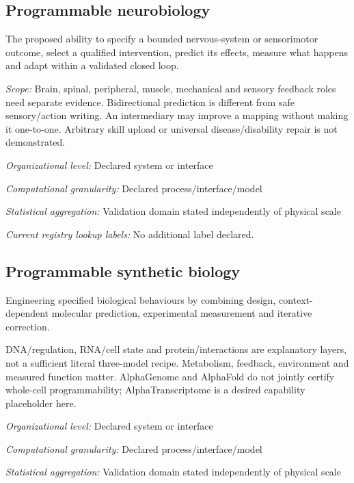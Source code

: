 \begin{samepage}
\subsection*{Programmable neurobiology}
\noindent The proposed ability to specify a bounded nervous-system or sensorimotor outcome, select a qualified intervention, predict its effects, measure what happens and adapt within a validated closed loop.\par
\end{samepage}
\noindent\textit{Scope:} Brain, spinal, peripheral, muscle, mechanical and sensory feedback roles need separate evidence. Bidirectional prediction is different from safe sensory/action writing. An intermediary may improve a mapping without making it one-to-one. Arbitrary skill upload or universal disease/disability repair is not demonstrated.\par
\noindent\textit{Organizational level:} Declared system or interface\par
\noindent\textit{Computational granularity:} Declared process/interface/model\par
\noindent\textit{Statistical aggregation:} Validation domain stated independently of physical scale\par


\noindent\textit{Current registry lookup labels:} No additional label declared.\par

\begin{samepage}
\subsection*{Programmable synthetic biology}
\noindent Engineering specified biological behaviours by combining design, context-dependent molecular prediction, experimental measurement and iterative correction.\par
\end{samepage}
\noindent DNA/regulation, RNA/cell state and protein/interactions are explanatory layers, not a sufficient literal three-model recipe. Metabolism, feedback, environment and measured function matter. AlphaGenome and AlphaFold do not jointly certify whole-cell programmability; AlphaTranscriptome is a desired capability placeholder here.\par
\noindent\textit{Organizational level:} Declared system or interface\par
\noindent\textit{Computational granularity:} Declared process/interface/model\par
\begin{samepage}
\noindent\textit{Statistical aggregation:} Validation domain stated independently of physical scale\par\nopagebreak[4]

\end{samepage}


